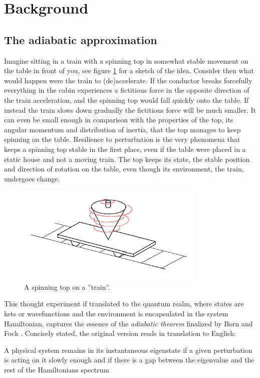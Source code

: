 \documentclass[main.tex]{subfiles}
\begin{document}
\section{Background}
\subsection{The adiabatic approximation}\label{sec:adiab}
Imagine sitting in a train with a spinning top in somewhat stable movement on the table in
front of you, see figure \ref{fig:toptrain} for a sketch of the idea. Consider then what would happen were the train to (de)accelerate. If the
conductor breaks forcefully everything in the cabin experiences a fictitious force in the
opposite direction of the train acceleration, and the spinning top would fall quickly onto
the table. If instead the train slows down gradually the fictitious force will be much
smaller. It can even be small enough in comparison with the properties of the top, its
angular momentum and distribution of inertia, that the top manages to keep spinning on
the table. Resilience to perturbation is the very phenomena that keeps a spinning top
stable in the first place, even if the table were placed in a static house and not a moving
train. The top keeps its state, the stable position and direction of rotation on the table,
even though its environment, the train, undergoes change. 

\begin{figure}[h]
        \centering
        \includegraphics[width=0.8\textwidth]{figures/top_train.png}
        \caption{A spinning top on a ''train''.}
        \label{fig:toptrain}
\end{figure}

This thought experiment if translated to the quantum realm, where states are kets or
wavefunctions and the environment is encapsulated in the system Hamiltonian, captures the
essence of the \textit{adiabatic theorem} finalized by Born and Fock \cite{adiab}. Concisely
stated, the original version reads in translation to English:
\begin{displayquote}
A physical system remains in its instantaneous eigenstate if a given perturbation is acting
on it slowly enough and if there is a gap between the eigenvalue and the rest of the
Hamiltonians spectrum
\end{displayquote}
\end{document}
